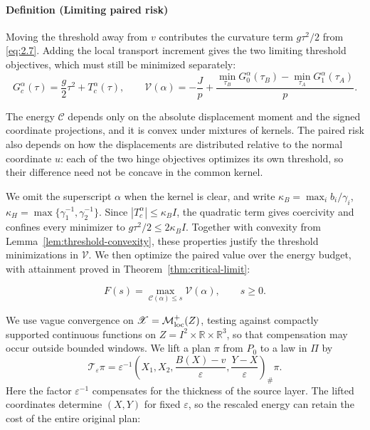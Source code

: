 \paragraph{Definition (Limiting paired risk)} Moving the threshold away from \(v\) contributes the curvature term \(g\tau^2/2\) from \eqref{eq:2.7}. Adding the local transport increment gives the two limiting threshold objectives, which must still be minimized separately:
\begin{equation}
G_c^\alpha(\tau)=\frac g2\tau^2+T_c^\alpha(\tau),\qquad
\mathcal V(\alpha)=-\frac Jp+
\frac{\min_{\tau_B}G_0^\alpha(\tau_B)-\min_{\tau_A}G_1^\alpha(\tau_A)}p.
\tag{3.2}\label{eq:3.2}
\end{equation}

The energy \(\mathcal C\) depends only on the absolute displacement moment and the signed coordinate projections, and it is convex under mixtures of kernels. The paired risk also depends on how the displacements are distributed relative to the normal coordinate \(u\): each of the two hinge objectives optimizes its own threshold, so their difference need not be concave in the common kernel.

We omit the superscript \(\alpha\) when the kernel is clear, and write \(\kappa_B=\max_i b_i/\gamma_i\), \(\kappa_H=\max\{\gamma_1^{-1},\gamma_2^{-1}\}\). Since \(|T_c^\alpha|\le\kappa_BI\), the quadratic term gives coercivity and confines every minimizer to \(g\tau^2/2\le2\kappa_BI\). Together with convexity from Lemma~\ref{lem:threshold-convexity}, these properties justify the threshold minimizations in \(\mathcal V\). We then optimize the paired value over the energy budget, with attainment proved in Theorem~\ref{thm:critical-limit}:

\begin{equation}
F(s)=\max_{\mathcal C(\alpha)\le s}\mathcal V(\alpha),\qquad s\ge0.
\tag{3.3}\label{eq:3.3}
\end{equation}

We use vague convergence on \(\mathscr X=\mathcal M^+_{\rm loc}(Z)\), testing against compactly supported continuous functions on \(Z=I^2\times\mathbb R\times\mathbb R^3\), so that compensation may occur outside bounded windows. We lift a plan \(\pi\) from \(P_0\) to a law in \(\Pi\) by
\[
\mathscr T_\varepsilon\pi=\varepsilon^{-1}
\left(X_1,X_2,\frac{B(X)-v}{\varepsilon},\frac{Y-X}{\varepsilon}\right)_\#\pi.
\]
Here the factor \(\varepsilon^{-1}\) compensates for the thickness of the source layer. The lifted coordinates determine \((X,Y)\) for fixed \(\varepsilon\), so the rescaled energy can retain the cost of the entire original plan:

